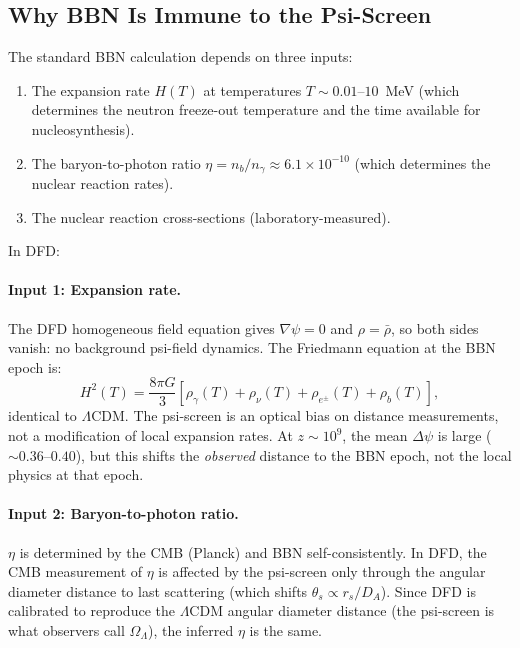 \documentclass[11pt,a4paper]{article}
\newcounter{findingctr}
\newenvironment{finding}[1][]{%
  \refstepcounter{findingctr}%
  \begin{tcolorbox}[colback=blue!3!white, colframe=blue!50!black,
    title=\textbf{Finding \thefindingctr: #1}]
}{%
  \end{tcolorbox}%
}
\newcommand{\OmL}{\Omega_\Lambda}
\newcommand{\LCDM}{$\Lambda$CDM}
\newcommand{\Dpsi}{\Delta\psi}
\begin{document}
\begin{finding}[\textbf{BBN}: Standard Predictions Preserved]
\label{find:bbn}

\subsection*{Why BBN Is Immune to the Psi-Screen}

The standard BBN calculation depends on three inputs:
\begin{enumerate}[nosep]
\item The expansion rate $H(T)$ at temperatures $T \sim 0.01$--$10$~MeV
  (which determines the neutron freeze-out temperature and the
  time available for nucleosynthesis).
\item The baryon-to-photon ratio $\eta = n_b/n_\gamma \approx 6.1
  \times 10^{-10}$ (which determines the nuclear reaction rates).
\item The nuclear reaction cross-sections (laboratory-measured).
\end{enumerate}

In DFD:

\paragraph{Input 1: Expansion rate.}
The DFD homogeneous field equation gives $\nabla\psi = 0$ and
$\rho = \bar{\rho}$, so both sides vanish: no background psi-field
dynamics.  The Friedmann equation at the BBN epoch is:
\begin{equation}
H^2(T) = \frac{8\pi G}{3}\left[\rho_\gamma(T) + \rho_\nu(T)
+ \rho_{e^\pm}(T) + \rho_b(T)\right],
\end{equation}
identical to \LCDM.  The psi-screen is an optical bias on
distance measurements, not a modification of local expansion
rates.  At $z \sim 10^9$, the mean $\Dpsi$ is large ($\sim 0.36$--$0.40$),
but this shifts the \emph{observed} distance to the BBN epoch, not
the local physics at that epoch.

\paragraph{Input 2: Baryon-to-photon ratio.}
$\eta$ is determined by the CMB (Planck) and BBN self-consistently.
In DFD, the CMB measurement of $\eta$ is affected by the psi-screen
only through the angular diameter distance to last scattering
(which shifts $\theta_s \propto r_s/D_A$).  Since DFD is calibrated
to reproduce the \LCDM{} angular diameter distance (the psi-screen
is what observers call $\OmL$), the inferred $\eta$ is the same.


\end{finding}
\end{document}
